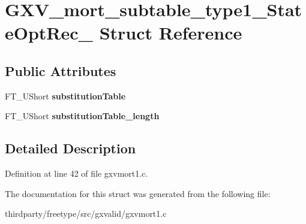 \hypertarget{struct_g_x_v__mort__subtable__type1___state_opt_rec__}{}\section{G\+X\+V\+\_\+mort\+\_\+subtable\+\_\+type1\+\_\+\+State\+Opt\+Rec\+\_\+ Struct Reference}
\label{struct_g_x_v__mort__subtable__type1___state_opt_rec__}
\subsection*{Public Attributes}
\begin{DoxyCompactItemize}
\item 
\mbox{\label{struct_g_x_v__mort__subtable__type1___state_opt_rec___a76933f244faef4878fb63377b6155262}} 
F\+T\+\_\+\+U\+Short {\bfseries substitution\+Table}
\item 
\mbox{\label{struct_g_x_v__mort__subtable__type1___state_opt_rec___acbf534c30305ac2a68315932cebd0ea5}} 
F\+T\+\_\+\+U\+Short {\bfseries substitution\+Table\+\_\+length}
\end{DoxyCompactItemize}


\subsection{Detailed Description}


Definition at line 42 of file gxvmort1.\+c.



The documentation for this struct was generated from the following file\+:\begin{DoxyCompactItemize}
\item 
thirdparty/freetype/src/gxvalid/gxvmort1.\+c\end{DoxyCompactItemize}
